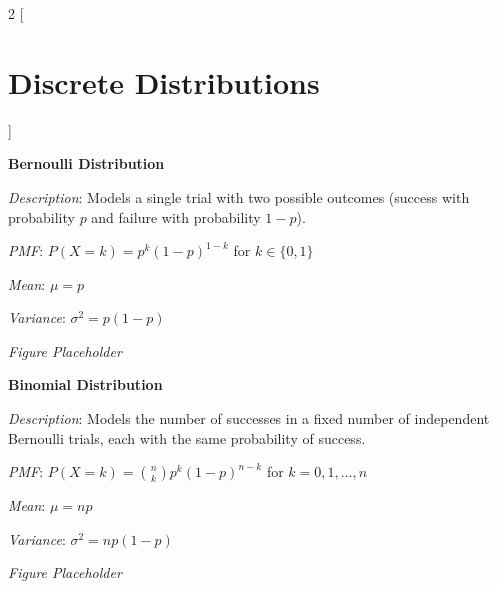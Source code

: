 \documentclass{article}
\begin{document}
\begin{multicols}{2}
[
\section*{Discrete Distributions}
]

\begin{mdframed}
\textbf{Bernoulli Distribution}

\textit{Description}: Models a single trial with two possible outcomes (success with probability $p$ and failure with probability $1-p$).

\textit{PMF}: $P(X=k) = p^k(1-p)^{1-k}$ for $k \in \{0,1\}$

\textit{Mean}: $\mu = p$

\textit{Variance}: $\sigma^2 = p(1-p)$

\textit{Figure Placeholder}

\end{mdframed}

\begin{mdframed}
\textbf{Binomial Distribution}

\textit{Description}: Models the number of successes in a fixed number of independent Bernoulli trials, each with the same probability of success.

\textit{PMF}: $P(X=k) = \binom{n}{k}p^k(1-p)^{n-k}$ for $k = 0, 1, ..., n$

\textit{Mean}: $\mu = np$

\textit{Variance}: $\sigma^2 = np(1-p)$

\textit{Figure Placeholder}

\end{mdframed}

\end{multicols}
\end{document}
